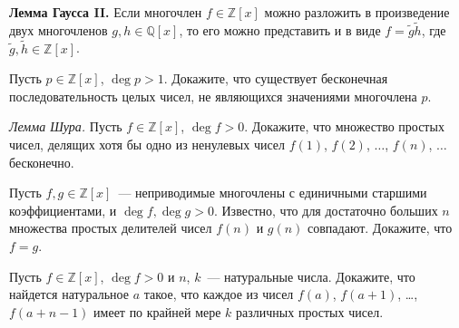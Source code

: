 \begin{problems}
\item\textbf{Лемма Гаусса II.}
Если многочлен $f \in \mathbb{Z}[x]$ можно разложить в произведение двух
многочленов $g, h \in \mathbb{Q}[x]$, то его можно представить и в виде
$f = \widetilde{g} \widetilde{h}$, где
$\widetilde{g}, \widetilde{h} \in \mathbb{Z}[x]$.

\item
Пусть $p \in \mathbb{Z}[x]$, $\deg p > 1$.
Докажите, что существует бесконечная последовательность целых чисел, не
являющихся значениями многочлена $p$.

\item\emph{Лемма Шура.}
Пусть $f \in \mathbb{Z}[x]$, $\deg f > 0$.
Докажите, что множество простых чисел, делящих хотя бы одно из ненулевых чисел
$f(1)$, $f(2)$, $\ldots$, $f(n)$, $\ldots$ бесконечно.

\item
Пусть $f, g \in \mathbb{Z}[x]$~--- неприводимые многочлены с единичными
старшими коэффициентами, и $\deg f, \deg g > 0$.
Известно, что для достаточно больших $n$ множества простых делителей чисел
$f(n)$ и $g(n)$ совпадают.
Докажите, что $f = g$.

\item
Пусть $f \in \mathbb{Z}[x]$, $\deg f > 0$ и $n$, $k$~--- натуральные числа.
Докажите, что найдется натуральное $a$ такое, что каждое из чисел $f(a)$,
$f(a + 1)$, \ldots, $f(a + n - 1)$ имеет по крайней мере $k$ различных простых
чисел.

\end{problems}

